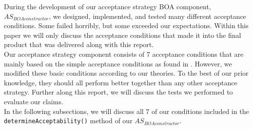 During the development of our acceptance strategy BOA component, $AS_{BOAconstructor}$, we designed, implemented, and tested many different acceptance conditions. Some failed horribly, but some exceeded our expectations. Within this paper we will only discuss the acceptance conditions that made it into the final product that was delivered along with this report.\\

Our acceptance strategy component consists of 7 acceptance conditions that are mainly based on the simple acceptance conditions as found in \cite{baarslag2013acceptance}. However, we modified these basic conditions according to our theories. To the best of our prior knowledge, they should all perform better together than any other acceptance strategy. Further along this report, we will discuss the tests we performed to evaluate our claims.\\

In the following subsections, we will discuss all 7 of our conditions included in the \texttt{determineAcceptability()} method of our $AS_{BOAconstructor}$.

